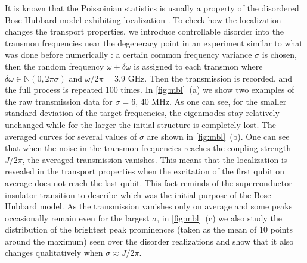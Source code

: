 \documentclass[%
 aps, prl,
 amsmath,amssymb,
 reprint,%
superscriptaddress
]{revtex4-2}
\begin{document}
It is known that the Poissoinian statistics is usually a property of the disordered Bose-Hubbard model exhibiting localization \cite{roushan2017spectroscopic, Yan2019,Ye2019}. To check how the localization changes the transport properties, we introduce controllable disorder into the transmon frequencies near the degeneracy point in an experiment similar to what was done before numerically \cite{orell2019probing}: a certain common frequency variance $\sigma$ is chosen, then the random frequency $\omega + \delta \omega$ is assigned to each transmon where $\delta\omega \in \mathbb N(0,2\pi\sigma)$ and $\omega/2\pi = 3.9$ GHz. Then the transmission is recorded, and the full process is repeated 100 times. 
In \autoref{fig:mbl}~(a) we show two examples of the raw transmission data for  $\sigma = 6,\, 40$ MHz. As one can see, for the smaller standard deviation of the target frequencies, the eigenmodes stay relatively unchanged while for the larger the initial structure is completely lost. The averaged curves for several values of $\sigma$ are shown in \autoref{fig:mbl}~(b). One can see that when the noise in the transmon frequencies reaches the coupling strength $J/2\pi$, the averaged transmission vanishes. This means that the localization is revealed in the transport properties when the excitation of the first qubit on average does not reach the last qubit. This fact reminds of the superconductor-insulator transition \cite{bruder1993superconductor} to describe which was the initial purpose of the Bose-Hubbard model. As the transmission vanishes only on average and some peaks occasionally remain even for the largest $\sigma$, in \autoref{fig:mbl}~(c) we also study the distribution of the brightest peak prominences (taken as the mean of 10 points around the maximum) seen over the disorder realizations and show that it also changes qualitatively when $\sigma \approx J/2\pi$.  

\end{document}
